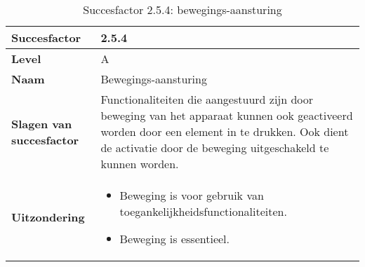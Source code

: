 \begin{table}[H]
    \centering
    \caption{Succesfactor 2.5.4: bewegings-aansturing}
    
    
    \hspace*{-1cm}\begin{tabular}{|l|p{12cm}|} 
        \hline
        \textbf{Succesfactor}                 & 2.5.4                                                                                                                                                                                                                                                                                                                                                                                                                                                                                                        \\ 
        \hline
        \textbf{Level}                        & A                                                                                                                                                                                                                                                                                                                                                                                                                                                                                                               \\ 
        \hline
        \textbf{Naam}                         & Bewegings-aansturing~                                                                                                                                                                                                                                                                                                                                                                                                                                                                                      \\ 
        \hline
        \textbf{Slagen van succesfactor}      & Functionaliteiten die aangestuurd zijn door beweging van het apparaat kunnen ook geactiveerd worden door een element in te drukken. Ook dient de activatie door de beweging uitgeschakeld te kunnen worden.
        \\ 
                \hline
        \textbf{Uitzondering}     & 
        \begin{itemize}
            \item Beweging is voor gebruik van toegankelijkheidsfunctionaliteiten.
            \item Beweging is essentieel.
        \end{itemize}                                                                                                                                                                                           \\ 


\end{tabular}
\end{table}
